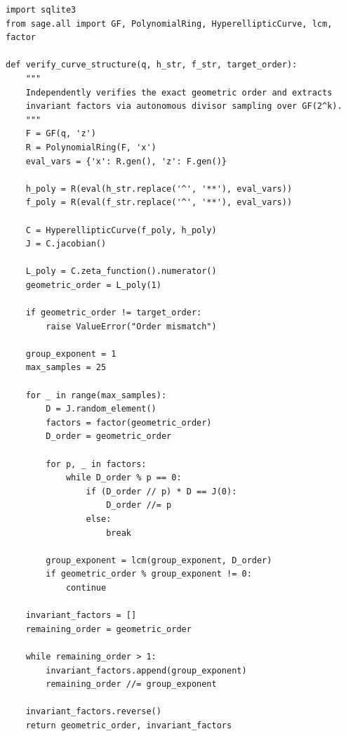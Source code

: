 \documentclass[12pt, letterpaper]{article}
\begin{document}
\begin{verbatim}
import sqlite3
from sage.all import GF, PolynomialRing, HyperellipticCurve, lcm, factor

def verify_curve_structure(q, h_str, f_str, target_order):
    """
    Independently verifies the exact geometric order and extracts 
    invariant factors via autonomous divisor sampling over GF(2^k).
    """
    F = GF(q, 'z')
    R = PolynomialRing(F, 'x')
    eval_vars = {'x': R.gen(), 'z': F.gen()} 
    
    h_poly = R(eval(h_str.replace('^', '**'), eval_vars))
    f_poly = R(eval(f_str.replace('^', '**'), eval_vars))
    
    C = HyperellipticCurve(f_poly, h_poly)
    J = C.jacobian()
    
    L_poly = C.zeta_function().numerator()
    geometric_order = L_poly(1)
    
    if geometric_order != target_order:
        raise ValueError("Order mismatch")
        
    group_exponent = 1
    max_samples = 25  
    
    for _ in range(max_samples):
        D = J.random_element()
        factors = factor(geometric_order)
        D_order = geometric_order
        
        for p, _ in factors:
            while D_order % p == 0:
                if (D_order // p) * D == J(0):
                    D_order //= p
                else:
                    break
                    
        group_exponent = lcm(group_exponent, D_order)
        if geometric_order % group_exponent != 0:
            continue 

    invariant_factors = []
    remaining_order = geometric_order
    
    while remaining_order > 1:
        invariant_factors.append(group_exponent)
        remaining_order //= group_exponent
        
    invariant_factors.reverse() 
    return geometric_order, invariant_factors
\end{verbatim}
\end{document}
